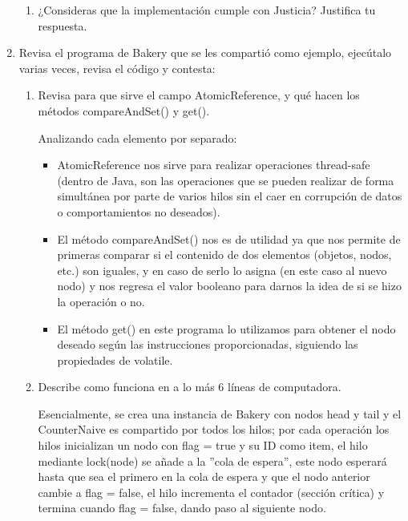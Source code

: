 \begin{enumerate}
\begin{enumerate}
        \item ¿Consideras que la implementación cumple con Justicia? Justifica tu respuesta.
    \end{enumerate}

    \hfill

    \item Revisa el programa de Bakery que se les compartió como ejemplo, ejecútalo varias veces, revisa el código y contesta:

    \begin{enumerate}
        \item Revisa para que sirve el campo AtomicReference, y qué hacen los métodos compareAndSet() y get().

        Analizando cada elemento por separado:

        \begin{itemize}
            \item AtomicReference nos sirve para realizar operaciones thread-safe (dentro de Java, son las operaciones que se pueden realizar de forma simultánea por parte de varios hilos sin el caer en corrupción de datos o comportamientos no deseados).

            \item El método compareAndSet() nos es de utilidad ya que nos permite de primeras comparar si el contenido de dos elementos (objetos, nodos, etc.) son iguales, y en caso de serlo lo asigna  (en este caso al nuevo nodo) y nos regresa el valor booleano para darnos la idea de si se hizo la operación o no. 

            \item El método get() en este programa lo utilizamos para obtener el nodo deseado según las instrucciones proporcionadas, siguiendo las propiedades de volatile.\\
            
        \end{itemize}

        

        \item Describe como funciona en a lo más 6 líneas de computadora.
        
        Esencialmente, se crea una instancia de Bakery con nodos head y tail y el CounterNaive es compartido por todos los hilos; por cada operación los hilos inicializan un nodo con flag = true y su ID como item, el hilo mediante lock(node) se añade a la ''cola de espera'', este nodo esperará hasta que sea el primero en la cola de espera y que el nodo anterior cambie a flag = false, el hilo incrementa el contador (sección crítica) y termina cuando flag = false, dando paso al siguiente nodo.\\


\end{enumerate}
\end{enumerate}

